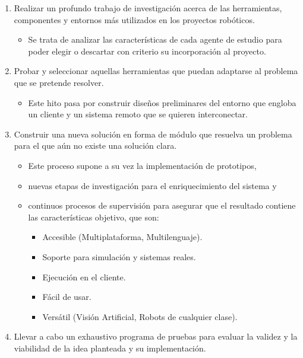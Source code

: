 \begin{enumerate}
\item Realizar un profundo trabajo de investigación acerca de las herramientas, componentes y entornos más utilizados en los proyectos robóticos.
    \begin{itemize}
        \item Se trata de analizar las características de cada agente de estudio para poder elegir o descartar con criterio su incorporación al proyecto.
    \end{itemize}
\item Probar y seleccionar aquellas herramientas que puedan adaptarse al problema que se pretende resolver.
    \begin{itemize}
        \item Este hito pasa por construir diseños preliminares del entorno que engloba un cliente y un sistema remoto que se quieren interconectar.
    \end{itemize}
\item Construir una nueva solución en forma de módulo que resuelva un problema para el que aún no existe una solución clara.
    \begin{itemize}
        \item Este proceso supone a su vez la implementación de prototipos,
        \item nuevas etapas de investigación para el enriquecimiento del sistema y
        \item continuos procesos de supervisión para asegurar que el resultado contiene las características objetivo, que son:
            \begin{itemize}
                \item Accesible (Multiplataforma, Multilenguaje).
                \item Soporte para simulación y sistemas reales.
                \item Ejecución en el cliente.
                \item Fácil de usar.
                \item Versátil (Visión Artificial, Robots de cualquier clase).
            \end{itemize}
    \end{itemize}
\item  Llevar a cabo un exhaustivo programa de pruebas para evaluar la validez y la viabilidad de la idea planteada y su implementación.
\end{enumerate}

